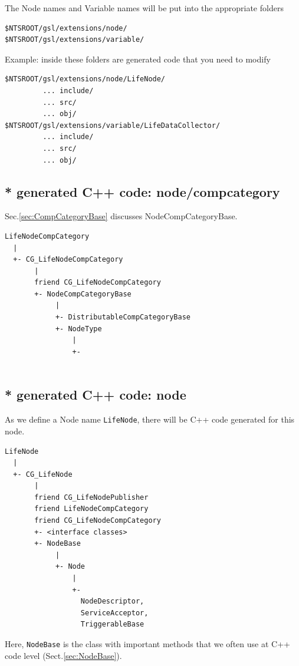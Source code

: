 The Node names and Variable names will be put into the appropriate folders
\begin{verbatim}
$NTSROOT/gsl/extensions/node/
$NTSROOT/gsl/extensions/variable/
\end{verbatim}

Example: inside these folders are generated code that you need to modify
\begin{verbatim}
$NTSROOT/gsl/extensions/node/LifeNode/
         ... include/
         ... src/
         ... obj/
$NTSROOT/gsl/extensions/variable/LifeDataCollector/
         ... include/
         ... src/
         ... obj/
\end{verbatim}



\subsection{* generated C++ code: node/compcategory}
\label{sec:MGS_user-defined-class-nodetype-compcategory}

Sec.\ref{sec:CompCategoryBase} discusses NodeCompCategoryBase.
\begin{verbatim}
LifeNodeCompCategory
  |
  +- CG_LifeNodeCompCategory
       |
       friend CG_LifeNodeCompCategory
       +- NodeCompCategoryBase
            |
            +- DistributableCompCategoryBase
            +- NodeType
                |
                +-         
       
\end{verbatim}

\subsection{* generated C++ code: node}
\label{sec:MGS_user-defined-class-nodetype}

As we define a Node name \verb!LifeNode!, there will be C++ code generated for
this node. 
\begin{verbatim}
LifeNode
  |
  +- CG_LifeNode
       |
       friend CG_LifeNodePublisher
       friend LifeNodeCompCategory
       friend CG_LifeNodeCompCategory
       +- <interface classes>
       +- NodeBase
            |
            +- Node
                |
                +-         
                  NodeDescriptor, 
                  ServiceAcceptor,
                  TriggerableBase
\end{verbatim}


Here, \verb!NodeBase! is the class with important methods that we often use at
C++ code level (Sect.\ref{sec:NodeBase}).



